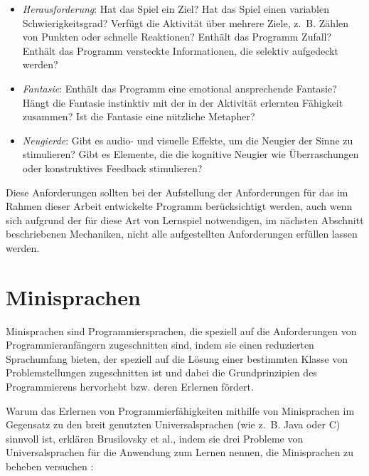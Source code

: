 \begin{itemize}
    \item \emph{Herausforderung}: Hat das Spiel ein Ziel? Hat das Spiel einen variablen Schwierigkeitsgrad? Verfügt die Aktivität über mehrere Ziele, z.~B. Zählen von Punkten oder schnelle Reaktionen? Enthält das Programm Zufall? Enthält das Programm versteckte Informationen, die selektiv aufgedeckt werden?
    \item \emph{Fantasie}: Enthält das Programm eine emotional ansprechende Fantasie? Hängt die Fantasie instinktiv mit der in der Aktivität erlernten Fähigkeit zusammen? Ist die Fantasie eine nützliche Metapher?
    \item \emph{Neugierde}: Gibt es audio- und visuelle Effekte, um die Neugier der Sinne zu stimulieren? Gibt es Elemente, die die kognitive Neugier wie Überraschungen oder konstruktives Feedback stimulieren?
\end{itemize}

Diese Anforderungen sollten bei der Aufstellung der Anforderungen für das im Rahmen dieser Arbeit entwickelte Programm berücksichtigt werden, auch wenn sich aufgrund der für diese Art von Lernspiel notwendigen, im nächsten Abschnitt beschriebenen Mechaniken, nicht alle aufgestellten Anforderungen erfüllen lassen werden.

\section{Minisprachen}
\label{sec:basics:mini-languages}

Minisprachen sind Programmiersprachen, die speziell auf die Anforderungen von Programmieranfängern zugeschnitten sind, indem sie einen reduzierten Sprachumfang bieten, der speziell auf die Lösung einer bestimmten Klasse von Problemstellungen zugeschnitten ist und dabei die Grundprinzipien des Programmierens hervorhebt bzw. deren Erlernen fördert.

Warum das Erlernen von Programmierfähigkeiten mithilfe von Minisprachen im Gegensatz zu den breit genutzten Universalsprachen (wie z.~B. Java oder C) sinnvoll ist, erklären Brusilovsky et al., indem sie drei Probleme von Universalsprachen für die Anwendung zum Lernen nennen, die Minisprachen zu beheben versuchen \cite[67]{brusilovsky1997}:

